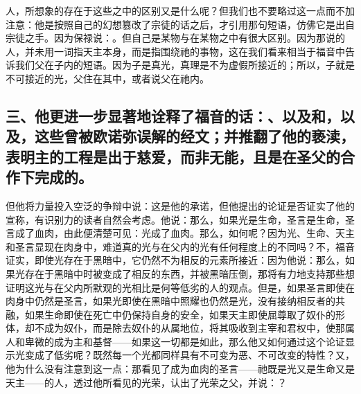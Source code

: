 人，所想象的存在于这些之中的区别又是什么呢？但我们也不要略过这一点而不加注意：他是按照自己的幻想篡改了宗徒的话之后，才引用那句短语，仿佛它是出自宗徒之手。因为保禄说：。但自己是某物与在某物之中有很大区别。因为那说的人，并未用一词指天主本身，而是指围绕祂的事物，这在我们看来相当于福音中告诉我们父在子内的短语。因为子是真光，真理是不为虚假所接近的；所以，子就是不可接近的光，父住在其中，或者说父在祂内。\par


\subsection{三、他更进一步显著地诠释了福音的话：、以及和，以及，这些曾被欧诺弥误解的经文；并推翻了他的亵渎，表明主的工程是出于慈爱，而非无能，且是在圣父的合作下完成的。}

但他将力量投入空泛的争辩中说：这是他的承诺，但他提出的论证是否证实了他的宣称，有识别力的读者自然会考虑。他说：那么，如果光是生命，圣言是生命，圣言成了血肉，由此便清楚可见：光成了血肉。那么，如何呢？因为光、生命、天主和圣言显现在肉身中，难道真的光与在父内的光有任何程度上的不同吗？不，福音证实，即使光存在于黑暗中，它仍然不为相反的元素所接近：因为他说：那么，如果光存在于黑暗中时被变成了相反的东西，并被黑暗压倒，那将有力地支持那些想证明这光与在父内所默观的光相比是何等低劣的人的观点。但是，如果圣言即使在肉身中仍然是圣言，如果光即使在黑暗中照耀也仍然是光，没有接纳相反者的共融，如果生命即使在死亡中仍保持自身的安全，如果天主即使屈尊取了奴仆的形体，却不成为奴仆，而是除去奴仆的从属地位，将其吸收到主宰和君权中，使那属人和卑微的成为主和基督——如果这一切都是如此，那么他又如何通过这个论证显示光变成了低劣呢？既然每一个光都同样具有不可变为恶、不可改变的特性？又，他为什么没有注意到这一点：那看见了成为血肉的圣言——祂既是光又是生命又是天主——的人，透过他所看见的光荣，认出了光荣之父，并说：？\par

